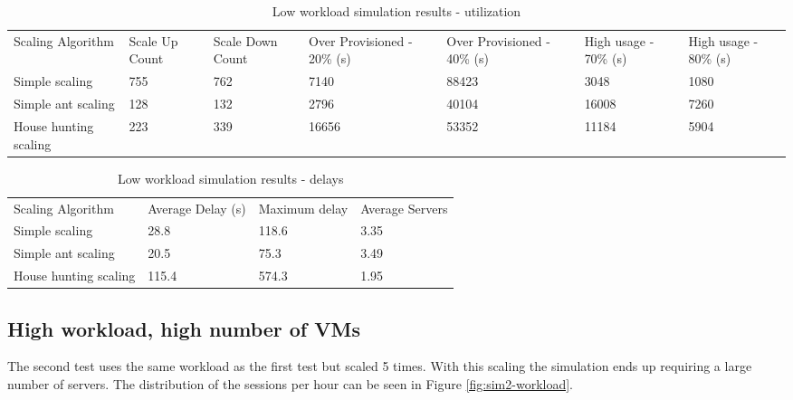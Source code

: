 \documentclass[conference]{IEEEtran}
\begin{document}
\begin{table}
\caption{Low workload simulation results - utilization}
\label{table:sim1}
\begin{tabu} to\linewidth{|X[c]|X[c]|X[c]|X[c]|X[c]|X[c]|X[c]|}
\everyrow{\hline}
\hline
Scaling Algorithm & Scale Up Count & Scale Down Count & Over Provisioned - 20\% (s) & Over Provisioned - 40\% (s) & High usage - 70\% (s) & High usage - 80\% (s) \\
Simple scaling & 755 & 762 & 7140 & 88423 & 3048 & 1080 \\
Simple ant scaling & 128 & 132 & 2796 & 40104 & 16008 & 7260 \\
House hunting scaling & 223 & 339 & 16656 & 53352 & 11184 & 5904 \\
\end{tabu}
\end{table}

\begin{table}
\caption{Low workload simulation results - delays}
\label{table:sim1-delay}
\begin{tabu} to\linewidth{|X[c]|X[c]|X[c]|X[c]|}
\everyrow{\hline}
\hline
Scaling Algorithm & Average Delay (s) & Maximum delay & Average Servers  \\
Simple scaling & 28.8 & 118.6 & 3.35 \\
Simple ant scaling & 20.5 & 75.3 & 3.49 \\
House hunting scaling & 115.4 & 574.3 & 1.95 \\
\end{tabu}
\end{table}

\subsection{High workload, high number of VMs}

The second test uses the same workload as the first test but scaled 5 times. With this scaling the simulation ends up requiring a large number of servers. The distribution of the sessions per hour can be seen in Figure \ref{fig:sim2-workload}.
\end{document}
